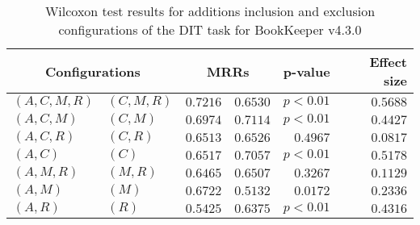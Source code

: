 
\begin{table}
\begin{spacing}{1.2}
\centering
\caption{Wilcoxon test results for additions inclusion and exclusion configurations of the DIT task for BookKeeper v4.3.0}
\label{table:versus-wilcox-bookkeeper-dit-additions}
\begin{tabular}{ll|rr|rr}
\toprule
      \multicolumn{2}{c|}{Configurations} &          \multicolumn{2}{c|}{MRRs} &       p-value & Effect size \\
\midrule
 $(A,C,M,R)$ &  $(C,M,R)$ & $0.7216$ & $0.6530$ & $p<0.01$ &    $0.5688$ \\
   $(A,C,M)$ &    $(C,M)$ & $0.6974$ & $0.7114$ & $p<0.01$ &    $0.4427$ \\
   $(A,C,R)$ &    $(C,R)$ & $0.6513$ & $0.6526$ & $0.4967$ &    $0.0817$ \\
     $(A,C)$ &      $(C)$ & $0.6517$ & $0.7057$ & $p<0.01$ &    $0.5178$ \\
   $(A,M,R)$ &    $(M,R)$ & $0.6465$ & $0.6507$ & $0.3267$ &    $0.1129$ \\
     $(A,M)$ &      $(M)$ & $0.6722$ & $0.5132$ & $0.0172$ &    $0.2336$ \\
     $(A,R)$ &      $(R)$ & $0.5425$ & $0.6375$ & $p<0.01$ &    $0.4316$ \\
\bottomrule
\end{tabular}

\end{spacing}
\end{table}

